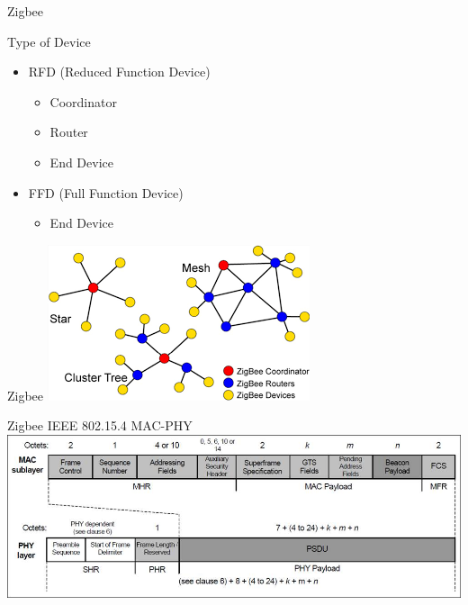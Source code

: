 \documentclass[serif,Blue]{beamer}
\begin{document}
\begin{frame}{Zigbee}
	\begin{block}{Type of Device}
		\begin{itemize}\justifying{}
			\item RFD (Reduced Function Device)
			\begin{itemize}\justifying{}
				\item Coordinator
				\item Router
				\item End Device
			\end{itemize}
			\item FFD (Full Function Device)
			\begin{itemize}\justifying{}
				\item End Device
			\end{itemize}
		\end{itemize}
	\end{block}
\end{frame}

\begin{frame}{Zigbee}
	\center\includegraphics[scale=.7]{img/ztopo.png}
\end{frame}

\begin{frame}{Zigbee}
	IEEE 802.15.4 MAC-PHY
	\center\includegraphics[scale=.4]{img/154frame.jpg}
\end{frame}
\end{document}

